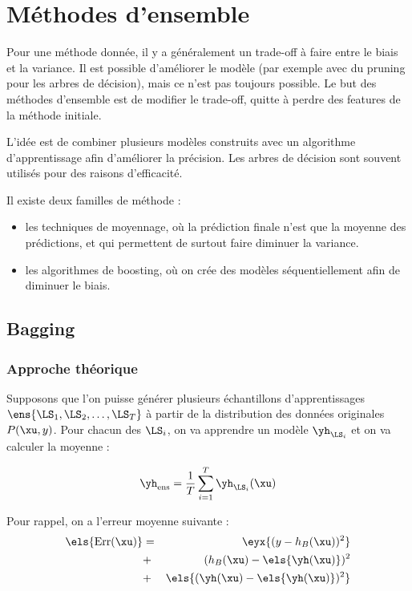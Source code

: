 \chapter{Méthodes d'ensemble}

Pour une méthode donnée, il y a généralement un trade-off à faire entre le biais et la variance. Il est possible d'améliorer le modèle (par exemple avec du pruning pour les arbres de décision), mais ce n'est pas toujours possible. Le but des méthodes d'ensemble est de modifier le trade-off, quitte à perdre des features de la méthode initiale.


L'idée est de combiner plusieurs modèles construits avec un algorithme d'apprentissage afin d'améliorer la précision. Les arbres de décision sont souvent utilisés pour des raisons d'efficacité.

Il existe deux familles de méthode :

\begin{itemize}
	\item les techniques de moyennage, où la prédiction finale n'est que la moyenne des prédictions, et qui permettent de surtout faire diminuer la variance.
	\item les algorithmes de boosting, où on crée des modèles séquentiellement afin de diminuer le biais.
\end{itemize}

\section{Bagging}

	\subsection{Approche théorique}
	Supposons que l'on puisse générer plusieurs échantillons d'apprentissages $\ens{\LS_1, \LS_2, \dots , \LS_T}$ à partir de la distribution des données originales $P(\xu, y)$. Pour chacun des $\LS_i$, on va apprendre un modèle $\yh_{\LS_i}$ et on va calculer la moyenne :
	
	$$\yh_{\text{ens}} = \frac{1}{T} \sum_{i = 1}^T \yh_{\LS_i}(\xu)$$
	
	Pour rappel, on a l'erreur moyenne suivante :
	\begin{eqnarray*}
	\els{\text{Err}(\xu)} & = & \eyx{(y - h_B(\xu))^2} \\
	 & + & (h_B(\xu) - \els{\yh(\xu)})^2 \\
	 & + & \els{(\yh(\xu) - \els{\yh(\xu)})^2}
	\end{eqnarray*}
	
